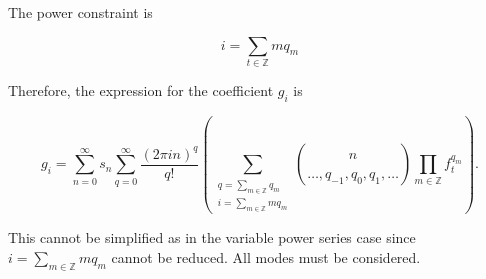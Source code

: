 \documentclass{article}
\begin{document}
    The power constraint is

    \begin{equation}
        i = \sum_{t \in \mathbb{Z}} m q_m
    \end{equation}

    Therefore, the expression for the coefficient $g_i$ is

    \begin{equation}
        g_i = \sum_{n=0}^{\infty} s_n \sum_{q=0}^{\infty} \frac{(2\pi in)^q}{q!} \left(\sum_{\substack{q = \sum_{m \in \mathbb{Z}} q_m \\ i=\sum_{m \in \mathbb{Z}} m q_m}} \binom{n}{\ldots, q_{-1}, q_{0}, q_{1}, \dots} \prod_{m \in \mathbb{Z}}f_t^{q_m} \right).
    \end{equation}

    This cannot be simplified as in the variable power series case since $i = \sum_{m \in \mathbb{Z}} m q_m$ cannot be reduced. All modes must be considered.
\end{document}
